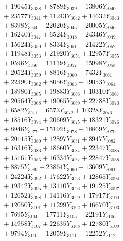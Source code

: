 \documentclass[a4paper,10pt]{article}
\begin{document}
{\begin{align}
&\;  + 19645 Y_{3038} + 8789 Y_{3039} + 13806 Y_{3040} \\[0.3ex]
&\;  + 23577 Y_{3041} + 11243 Y_{3042} + 14632 Y_{3043} \\[0.3ex]
&\;  + 8398 Y_{3044} + 22020 Y_{3045} + 20005 Y_{3046} \\[0.3ex]
&\;  + 16240 Y_{3047} + 6524 Y_{3048} + 24346 Y_{3049} \\[0.3ex]
&\;  + 15624 Y_{3050} + 8334 Y_{3051} + 21422 Y_{3052} \\[0.3ex]
&\;  + 11948 Y_{3053} + 21920 Y_{3054} + 12957 Y_{3055} \\[0.3ex]
&\;  + 9596 Y_{3056} + 11119 Y_{3057} + 15998 Y_{3058} \\[0.5ex]\allowbreak
&\;  + 20524 Y_{3059} + 8816 Y_{3060} + 7432 Y_{3061} \\[0.3ex]
&\;  + 22390 Y_{3062} + 8056 Y_{3063} + 19053 Y_{3064} \\[0.3ex]
&\;  + 18980 Y_{3065} + 19883 Y_{3066} + 10310 Y_{3067} \\[0.3ex]
&\;  + 20564 Y_{3068} + 19065 Y_{3069} + 22788 Y_{3070} \\[0.3ex]
&\;  + 6582 Y_{3071} + 6573 Y_{3072} + 10328 Y_{3073} \\[0.3ex]
&\;  + 18516 Y_{3074} + 20609 Y_{3075} + 18321 Y_{3076} \\[0.3ex]
&\;  + 8946 Y_{3077} + 15192 Y_{3078} + 18869 Y_{3079} \\[0.3ex]
&\;  + 20115 Y_{3080} + 12897 Y_{3081} + 8947 Y_{3082} \\[0.3ex]
&\;  + 16316 Y_{3083} + 18660 Y_{3084} + 22347 Y_{3085} \\[0.3ex]
&\;  + 15161 Y_{3086} + 16334 Y_{3087} + 22847 Y_{3088} \\[0.5ex]\allowbreak
&\;  + 8875 Y_{3089} + 23864 Y_{3090} + 13609 Y_{3091} \\[0.3ex]
&\;  + 24224 Y_{3092} + 17622 Y_{3093} + 12865 Y_{3094} \\[0.3ex]
&\;  + 19342 Y_{3095} + 13110 Y_{3096} + 19125 Y_{3097} \\[0.3ex]
&\;  + 12652 Y_{3098} + 14116 Y_{3099} + 17917 Y_{3100} \\[0.3ex]
&\;  + 12050 Y_{3101} + 11299 Y_{3102} + 16670 Y_{3103} \\[0.3ex]
&\;  + 7695 Y_{3104} + 17711 Y_{3105} + 22191 Y_{3106} \\[0.3ex]
&\;  + 14958 Y_{3107} + 22635 Y_{3108} + 12780 Y_{3109} \\[0.3ex]
&\;  + 9794 Y_{3110} + 12059 Y_{3111} + 12252 Y_{3112} \\[0.3ex]

\end{align}}
\end{document}

